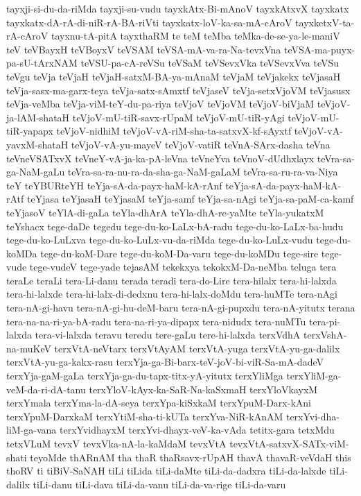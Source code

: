{tayxji-si-du-da-riMda
tayxji-su-vudu
tayxkAtx-Bi-mAnoV
tayxkAtxvX
tayxkatx
tayxkatx-dA-rA-di-niR-rA-BA-riVti
tayxkatx-loV-ka-sa-mA-cAroV
tayxketxV-ta-rA-cAroV
tayxnu-tA-pitA
tayxthaRM
te
teM
teMba
teMka-de-se-ya-le-maniV
teV
teVBayxH
teVBoyxV
teVSAM
teVSA-mA-va-ra-Na-tevxVna
teVSA-ma-puyx-pa-sU-tArxNAM
teVSU-pa-cA-reVSu
teVSaM
teVSevxVka
teVSevxVva
teVSu
teVgu
teVja
teVjaH
teVjaH-satxM-BA-ya-mAnaM
teVjaM
teVjakekx
teVjasaH
teVja-sasx-ma-garx-teya
teVja-satx-sAmxtf
teVjaseV
teVja-setxVjoVM
teVjasusx
teVja-veMba
teVja-viM-teY-du-pa-riya
teVjoV
teVjoVM
teVjoV-biVjaM
teVjoV-ja-lAM-shataH
teVjoV-mU-tiR-savx-rUpaM
teVjoV-mU-tiR-yAgi
teVjoV-mU-tiR-yapapx
teVjoV-nidhiM
teVjoV-vA-riM-sha-ta-satxvX-kf-sAyxtf
teVjoV-vA-yavxM-shataH
teVjoV-vA-yu-mayeV
teVjoV-vatiR
teVnA-SArx-dasha
teVna
teVneVSATxvX
teVneY-vA-ja-ka-pA-leVna
teVneYva
teVnoV-dUdhxlayx
teVra-sa-ga-NaM-gaLu
teVra-sa-ra-nu-ra-da-sha-ga-NaM-gaLaM
teVra-sa-ru-ra-va-Niya
teY
teYBURteYH
teYja-sA-da-payx-haM-kA-rAnf
teYja-sA-da-payx-haM-kA-rAtf
teYjasa
teYjasaH
teYjasaM
teYja-samf
teYja-sa-nAgi
teYja-sa-paM-ca-kamf
teYjasoV
teYlA-di-gaLa
teYla-dhArA
teYla-dhA-re-yaMte
teYla-yukatxM
teYshacx
tege-daDe
tegedu
tege-du-ko-LaLx-bA-radu
tege-du-ko-LaLx-ba-hudu
tege-du-ko-LuLxva
tege-du-ko-LuLx-vu-da-riMda
tege-du-ko-LuLx-vudu
tege-du-koMDa
tege-du-koM-Dare
tege-du-koM-Da-varu
tege-du-koMDu
tege-sire
tege-vude
tege-vudeV
tege-yade
tejasAM
tekekxya
tekokxM-Da-neMba
teluga
tera
teraLe
teraLi
tera-Li-danu
terada
teradi
tera-do-Lire
tera-hilalx
tera-hi-lalxda
tera-hi-lalxde
tera-hi-lalx-di-dedxnu
tera-hi-lalx-doMdu
tera-huMTe
tera-nAgi
tera-nA-gi-havu
tera-nA-gi-hu-deM-baru
tera-nA-gi-pupxdu
tera-nA-yitutx
terana
tera-na-na-ri-ya-bA-radu
tera-na-ri-ya-dipapx
tera-nidudx
tera-nuMTu
tera-pi-lalxda
tera-vi-lalxda
teravu
teredu
tere-gaLu
tere-hi-lalxda
terxVdhA
terxVshA-na-muKeV
terxVtA-neVtarx
terxVtAyAM
terxVtA-yuga
terxVtA-yu-ga-dalilx
terxVtA-yu-ga-kakx-rasu
terxYja-ga-Bi-barx-teV-joV-bi-viR-Sa-mA-dadeV
terxYja-gaM-gaLa
terxYja-ga-du-tapx-titx-yA-yitutx
terxYliMga
terxYliM-ga-veM-da-ri-dA-tanu
terxYloV-kAyx-ka-SaR-Na-kaSxmaH
terxYloVkayxM
terxYmala
terxYma-la-dA-seya
terxYpa-kiSxkaM
terxYpuM-Darx-kAni
terxYpuM-DarxkaM
terxYtiM-sha-ti-kUTa
terxYva-NiR-kAnAM
terxYvi-dha-liM-ga-vana
terxYvidhayxM
terxYvi-dhayx-veV-ka-vAda
tetitx-gara
tetxMdu
tetxVLuM
tevxV
tevxVka-nA-la-kaMdaM
tevxVtA
tevxVtA-satxvX-SATx-viM-shati
teyoMde
thARnAM
tha
thaR
thaRsavx-rUpAH
thavA
thavaR-veVdaH
this
thoRV
ti
tiBiV-SaNAH
tiLi
tiLida
tiLi-daMte
tiLi-da-dadxra
tiLi-da-lalxde
tiLi-dalilx
tiLi-danu
tiLi-dava
tiLi-da-vanu
tiLi-da-va-rige
tiLi-da-varu
}
